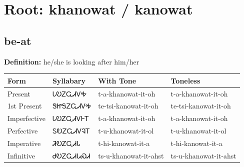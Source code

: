 \documentclass{article}%
\begin{document}
%
\normalsize%
\section*{Root: khanowat / kanowat}%
\subsection*{be-at}%
\textbf{Definition: }%
he/she is looking after him/her%
\\[0.5em]%
\begin{tabular}{|l|l|l|l|}%
\hline%
\textbf{Form}&\textbf{Syllabary}&\textbf{With Tone}&\textbf{Toneless}\\%
\hline%
Present&ᏓᎧᏃᏩᏗᏙᎭ&t{-}a{-}khanowat{-}it{-}oh&t{-}a{-}khanowat{-}it{-}oh\\%
1st Present&ᏕᏥᎦᏃᏩᏗᏙᎭ&te{-}tsi{-}kanowat{-}it{-}oh&te{-}tsi{-}kanowat{-}it{-}oh\\%
Imperfective&ᏓᎧᏃᏩᏗᏙᎰᎢ&t{-}a{-}khanowat{-}it{-}oh&t{-}a{-}khanowat{-}it{-}oh\\%
Perfective&ᏚᎧᏃᏩᏗᏙᎸᎢ&t{-}u{-}khanowat{-}it{-}ol&t{-}u{-}khanowat{-}it{-}ol\\%
Imperative&ᏘᎧᏃᏩᏗᏓ&t{-}hi{-}kanowat{-}it{-}a&t{-}hi{-}kanowat{-}it{-}a\\%
Infinitive&ᏧᎧᏃᏩᏗᏓᏍᏗ&ts{-}u{-}khanowat{-}it{-}ahst&ts{-}u{-}khanowat{-}it{-}ahst\\%
\hline%
\end{tabular}%
\\[1em]%
\end{document}
